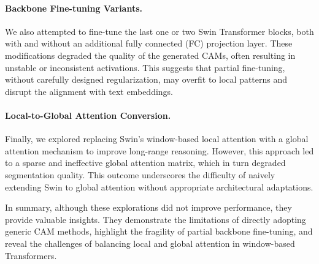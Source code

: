 \paragraph{Backbone Fine-tuning Variants.}
We also attempted to fine-tune the last one or two Swin Transformer blocks, both with and without an additional fully connected (FC) projection layer. These modifications degraded the quality of the generated CAMs, often resulting in unstable or inconsistent activations. This suggests that partial fine-tuning, without carefully designed regularization, may overfit to local patterns and disrupt the alignment with text embeddings.  

\paragraph{Local-to-Global Attention Conversion.}
Finally, we explored replacing Swin's window-based local attention with a global attention mechanism to improve long-range reasoning. However, this approach led to a sparse and ineffective global attention matrix, which in turn degraded segmentation quality. This outcome underscores the difficulty of naively extending Swin to global attention without appropriate architectural adaptations.  

In summary, although these explorations did not improve performance, they provide valuable insights. They demonstrate the limitations of directly adopting generic CAM methods, highlight the fragility of partial backbone fine-tuning, and reveal the challenges of balancing local and global attention in window-based Transformers.
